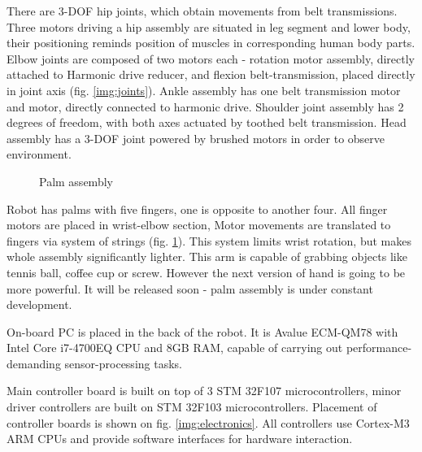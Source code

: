 \documentclass[letterpaper, 10 pt, conference]{ieeeconf}  %
\begin{document}
There are 3-DOF hip joints, which obtain movements from belt transmissions.
Three motors driving a hip assembly are situated in leg segment and lower body,
their positioning reminds position of muscles in corresponding human body
parts.
Elbow joints are composed of two motors each - rotation motor assembly, directly
attached to Harmonic drive reducer, and flexion belt-transmission, placed
directly in joint axis (fig. \ref{img:joints}).
Ankle assembly has one belt transmission motor and motor, directly connected
to harmonic drive.
Shoulder joint assembly has 2 degrees of freedom, with both axes actuated by
toothed belt transmission.
Head assembly has a 3-DOF joint powered by brushed
motors in order to observe environment.

\begin{figure}[thpb]
\caption{Palm assembly}
\label{img:wrist}
\end{figure} 

Robot has palms with five fingers, one is opposite to another four. All
finger motors are placed in wrist-elbow section, Motor movements are
translated to fingers via system of strings (fig. \ref{img:wrist}). This system
limits wrist rotation, but makes whole assembly significantly lighter. This arm
is capable of grabbing objects like tennis ball, coffee cup or screw. However the next
version of hand is going to be more powerful. It will be released soon - palm
assembly is under constant development.

On-board PC is placed in the back of the robot. It is Avalue ECM-QM78 with Intel
Core i7-4700EQ CPU and 8GB RAM, capable of carrying out performance-demanding
sensor-processing tasks. 

Main controller board is built on top of 3 STM 32F107 microcontrollers, minor
driver controllers are built on STM 32F103 microcontrollers. Placement of
controller boards is shown on fig. \ref{img:electronics}.  All controllers use
Cortex-M3 ARM CPUs and provide software interfaces for hardware interaction.
\end{document}
